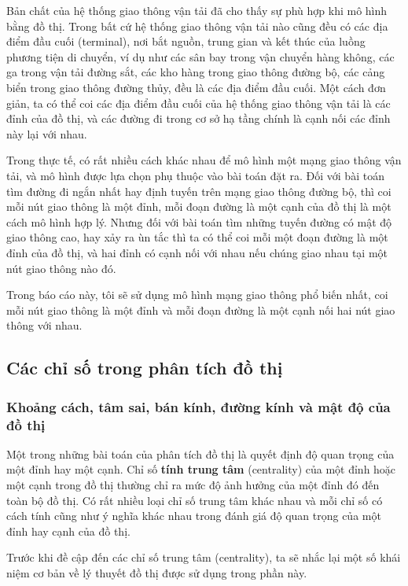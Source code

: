 \documentclass[14pt, oneside, a4paper, openany]{scrartcl}
\begin{document}
Bản chất của hệ thống giao thông vận tải đã cho thấy sự phù hợp khi mô hình bằng đồ thị. Trong bất cứ hệ thống giao thông vận tải nào cũng đều có các địa điểm đầu cuối (terminal), nơi bắt nguồn, trung gian và kết thúc của luồng phương tiện di chuyển, ví dụ như các sân bay trong vận chuyển hàng không, các ga trong vận tải đường sắt, các kho hàng trong giao thông đường bộ, các cảng biển trong giao thông đường thủy, đều là các địa điểm đầu cuối. Một cách đơn giản, ta có thể coi các địa điểm đầu cuối của hệ thống giao thông vận tải là các đỉnh của đồ thị, và các đường đi trong cơ sở hạ tầng chính là cạnh nối các đỉnh này lại với nhau.

Trong thực tế, có rất nhiều cách khác nhau để mô hình một mạng giao thông vận tải, và mô hình được lựa chọn phụ thuộc vào bài toán đặt ra. 
Đối với bài toán tìm đường đi ngắn nhất hay định tuyến trên mạng giao thông đường bộ, thì coi mỗi nút giao thông là một đỉnh, mỗi đoạn đường là một cạnh của đồ thị là một cách mô hình hợp lý. 
Nhưng đối với bài toán tìm những tuyến đường có mật độ giao thông cao, hay xảy ra ùn tắc thì ta có thể coi mỗi một đoạn đường là một đỉnh của đồ thị, và hai đỉnh có cạnh nối với nhau nếu chúng giao nhau tại một nút giao thông nào đó.

Trong báo cáo này, tôi sẽ sử dụng mô hình mạng giao thông phổ biến nhất, coi mỗi nút giao thông là một đỉnh và mỗi đoạn đường là một cạnh nối hai nút giao thông với nhau.
\subsection{Các chỉ số trong phân tích đồ thị}

\subsubsection{Khoảng cách, tâm sai, bán kính, đường kính và mật độ của đồ thị}

Một trong những bài toán của phân tích đồ thị là quyết định độ quan trọng của một đỉnh hay một cạnh. Chỉ số \textbf{tính trung tâm}  (centrality) của một đỉnh hoặc một cạnh trong đồ thị thường chỉ ra mức độ ảnh hưởng của một đỉnh đó đến toàn bộ đồ thị. Có rất nhiều loại chỉ số trung tâm khác nhau và mỗi chỉ số có cách tính cũng như ý nghĩa khác nhau trong đánh giá độ quan trọng của một đỉnh hay cạnh của đồ thị.

Trước khi đề cập đến các chỉ số trung tâm (centrality), ta sẽ nhắc lại một số khái niệm cơ bản về lý thuyết đồ thị được sử dụng trong phần này.
\end{document}

